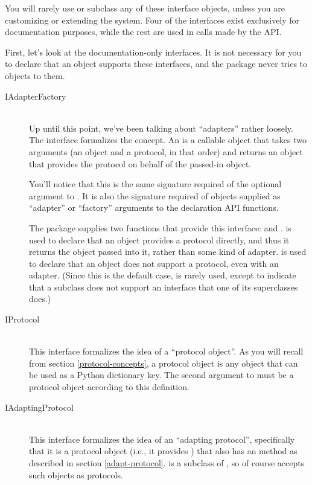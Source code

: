 \begin{verbatim%
}
\begin{verbatim%
}
\begin{verbatim%
}
\begin{verbatim%
}
\begin{verbatim%
}
\begin{verbatim%
}
You will rarely use or subclass any of these interface objects, unless you are
customizing or extending the system.  Four of the interfaces exist exclusively
for documentation purposes, while the rest are used in  calls
made by the API.

First, let's look at the documentation-only interfaces.  It is not necessary
for you to declare that an object supports these interfaces, and the
 package never tries to  objects to them.

\begin{description}

\item[IAdapterFactory] \hfill \\
Up until this point, we've been talking about ``adapters'' rather loosely.  The
 interface formalizes the concept.  An  is a callable object that takes two arguments (an object and a
protocol, in that order) and returns an object that provides the protocol on
behalf of the passed-in object.

You'll notice that this is the same signature required of the optional
 argument to .  It is also the signature required
of objects supplied as ``adapter'' or ``factory'' arguments to the declaration
API functions.

The  package supplies two functions that provide
this interface:  and .
 is used to declare that an object provides a
protocol directly, and thus it returns the object passed into it, rather than
some kind of adapter.   is used to declare that an
object does not support a protocol, even with an adapter.  (Since this is the
default case,  is rarely used, except to indicate
that a subclass does not support an interface that one of its superclasses
does.)

\item[IProtocol] \hfill \\
This interface formalizes the idea of a ``protocol object''.  As you will
recall from section \ref{protocol-concepts}, a protocol object is any object
that can be used as a Python dictionary key.  The second argument to
 must be a protocol object according to this definition.


\item[IAdaptingProtocol] \hfill \\
This interface formalizes the idea of an ``adapting protocol'', specifically
that it is a protocol object (i.e., it provides ) that also
has an  method as described in section \ref{adapt-protocol}.
 is a subclass of , so of course
 accepts such objects as protocols.


\end{description}
\end{verbatim%
}
\end{verbatim%
}
\end{verbatim%
}
\end{verbatim%
}
\end{verbatim%
}
\end{verbatim%
}
